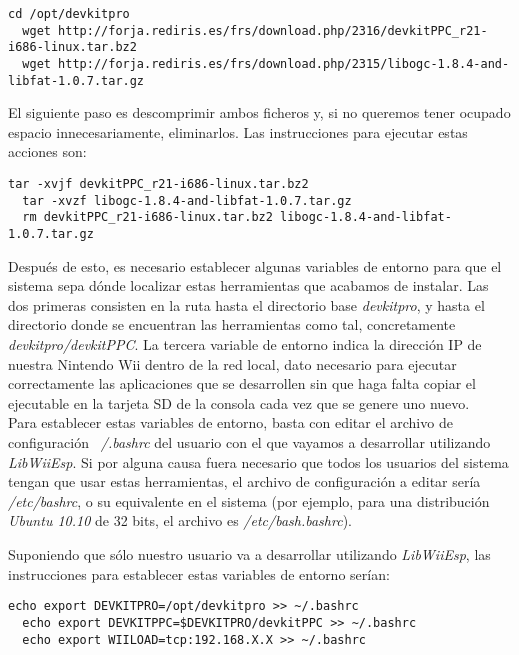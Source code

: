 \begin{lstlisting}[style=consola]
  cd /opt/devkitpro
  wget http://forja.rediris.es/frs/download.php/2316/devkitPPC_r21-i686-linux.tar.bz2
  wget http://forja.rediris.es/frs/download.php/2315/libogc-1.8.4-and-libfat-1.0.7.tar.gz
\end{lstlisting}

El siguiente paso es descomprimir ambos ficheros y, si no queremos tener ocupado espacio innecesariamente, eliminarlos. Las instrucciones para ejecutar estas acciones son:

\begin{lstlisting}[style=consola]
  tar -xvjf devkitPPC_r21-i686-linux.tar.bz2
  tar -xvzf libogc-1.8.4-and-libfat-1.0.7.tar.gz
  rm devkitPPC_r21-i686-linux.tar.bz2 libogc-1.8.4-and-libfat-1.0.7.tar.gz
\end{lstlisting}

Después de esto, es necesario establecer algunas variables de entorno para que el sistema sepa dónde localizar estas herramientas que acabamos de instalar. Las dos primeras consisten en la ruta hasta el directorio base \emph{devkitpro}, y hasta el directorio donde se encuentran las herramientas como tal, concretamente \emph{devkitpro/devkitPPC}. La tercera variable de entorno indica la dirección IP de nuestra Nintendo Wii dentro de la red local, dato necesario para ejecutar correctamente las aplicaciones que se desarrollen sin que haga falta copiar el ejecutable en la tarjeta SD de la consola cada vez que se genere uno nuevo. \\

Para establecer estas variables de entorno, basta con editar el archivo de configuración \emph{~/.bashrc} del usuario con el que vayamos a desarrollar utilizando \emph{LibWiiEsp}. Si por alguna causa fuera necesario que todos los usuarios del sistema tengan que usar estas herramientas, el archivo de configuración a editar sería \emph{/etc/bashrc}, o su equivalente en el sistema (por ejemplo, para una distribución \emph{Ubuntu 10.10} de 32 bits, el archivo es \emph{/etc/bash.bashrc}).

Suponiendo que sólo nuestro usuario va a desarrollar utilizando \emph{LibWiiEsp}, las instrucciones para establecer estas variables de entorno serían:

\begin{lstlisting}[style=consola]
  echo export DEVKITPRO=/opt/devkitpro >> ~/.bashrc
  echo export DEVKITPPC=$DEVKITPRO/devkitPPC >> ~/.bashrc
  echo export WIILOAD=tcp:192.168.X.X >> ~/.bashrc
\end{lstlisting}

